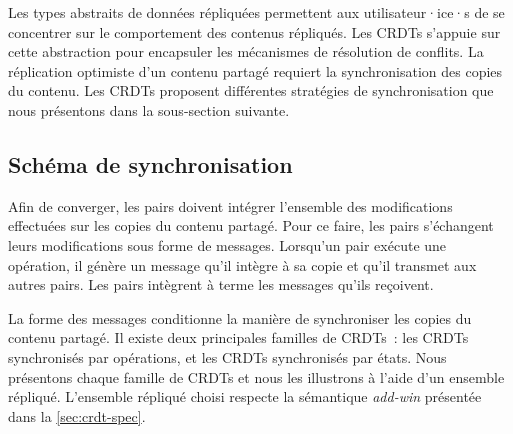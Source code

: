 

Les types abstraits de données répliquées permettent aux utilisateur·ice·s de se concentrer sur le comportement des contenus répliqués.
Les \acp{CRDT} s'appuie sur cette abstraction pour encapsuler les mécanismes de résolution de conflits.
La réplication optimiste d'un contenu partagé requiert la synchronisation des copies du contenu.
Les \acp{CRDT} proposent différentes stratégies de synchronisation que nous présentons dans la sous-section suivante.


\subsection{Schéma de synchronisation}\label{sec:crdt-sync}

Afin de converger, les pairs doivent intégrer l'ensemble des modifications effectuées sur les copies du contenu partagé.
Pour ce faire, les pairs s'échangent leurs modifications sous forme de messages.
Lorsqu'un pair exécute une opération, il génère un message qu'il intègre à sa copie et qu'il transmet aux autres pairs.
Les pairs intègrent à terme les messages qu'ils reçoivent.

La forme des messages conditionne la manière de synchroniser les copies du contenu partagé.
Il existe deux principales familles de \acp{CRDT}~: les \acp{CRDT} synchronisés par opérations, et les \acp{CRDT} synchronisés par états.
Nous présentons chaque famille de \acp{CRDT} et nous les illustrons à l'aide d'un ensemble répliqué.
L'ensemble répliqué choisi respecte la sémantique \emph{add-win} présentée dans la \autoref{sec:crdt-spec}.

